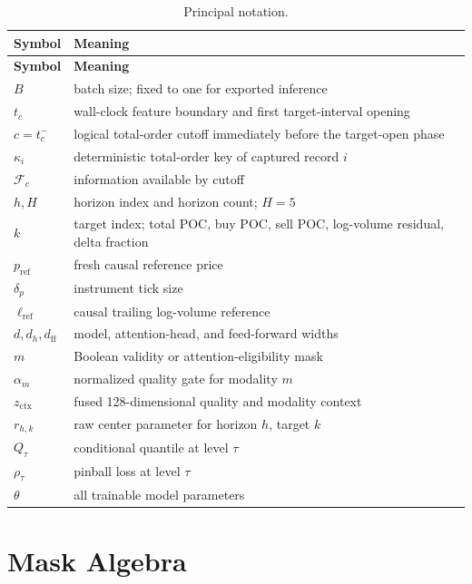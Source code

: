 \documentclass[10pt,letterpaper]{article}
\numberwithin{equation}{section}
\theoremstyle{definition}
\theoremstyle{remark}
\begin{document}
\begin{longtable}{@{}p{3.2cm}p{12.6cm}@{}}
\caption{Principal notation.}\label{tab:notation}\\
\toprule
\textbf{Symbol} & \textbf{Meaning}\\
\midrule
\endfirsthead
\toprule
\textbf{Symbol} & \textbf{Meaning}\\
\midrule
\endhead
$B$ & batch size; fixed to one for exported inference\\
$t_c$ & wall-clock feature boundary and first target-interval opening\\
$c=t_c^{-}$ & logical total-order cutoff immediately before the target-open phase\\
$\kappa_i$ & deterministic total-order key of captured record \(i\)\\
$\mathcal F_c$ & information available by cutoff\\
$h,H$ & horizon index and horizon count; $H=5$\\
$k$ & target index; total POC, buy POC, sell POC, log-volume residual, delta fraction\\
$p_{\mathrm{ref}}$ & fresh causal reference price\\
$\delta_p$ & instrument tick size\\
$\ell_{\mathrm{ref}}$ & causal trailing log-volume reference\\
$d,d_h,d_{\mathrm{ff}}$ & model, attention-head, and feed-forward widths\\
$m$ & Boolean validity or attention-eligibility mask\\
$\alpha_m$ & normalized quality gate for modality $m$\\
$z_{\mathrm{ctx}}$ & fused 128-dimensional quality and modality context\\
$r_{h,k}$ & raw center parameter for horizon \(h\), target \(k\)\\
$Q_\tau$ & conditional quantile at level $\tau$\\
$\rho_\tau$ & pinball loss at level $\tau$\\
$\theta$ & all trainable model parameters\\
\bottomrule
\end{longtable}

\section{Mask Algebra}
\end{document}
